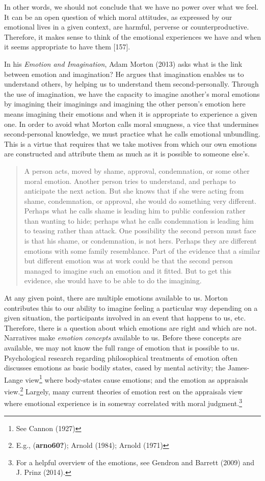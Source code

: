 \documentclass[12pt]{book}
\theoremstyle{definition}
\theoremstyle{remark}
\begin{document}
In other words, we should not conclude that we have no power over what we feel. It can be an open question of which moral attitudes, as expressed by our emotional lives in a given context, are harmful, perverse or counterproductive. Therefore, it makes sense to think of the emotional experiences we have and when it seems appropriate to have them {[}157{]}.

In his \emph{Emotion and Imagination}, Adam Morton (2013) asks what is the link between emotion and imagination? He argues that imagination enables us to understand others, by helping us to understand them second-personally. Through the use of imagination, we have the capacity to imagine another's moral emotions by imagining their imaginings and imagining the other person's emotion here means imagining their emotions and when it is appropriate to experience a given one. In order to avoid what Morton calls moral smugness, a vice that undermines second-personal knowledge, we must practice what he calls emotional unbundling. This is a virtue that requires that we take motives from which our own emotions are constructed and attribute them as much as it is possible to someone else's.

\begin{quote}
A person acts, moved by shame, approval, condemnation, or some other moral emotion. Another person tries to understand, and perhaps to anticipate the next action. But she knows that if she were acting from shame, condemnation, or approval, she would do something very different. Perhaps what he calls shame is leading him to public confession rather than wanting to hide; perhaps what he calls condemnation is leading him to teasing rather than attack. One possibility the second person must face is that his shame, or condemnation, is not hers. Perhaps they are different emotions with some family resemblance. Part of the evidence that a similar but different emotion was at work could be that the second person managed to imagine such an emotion and it fitted. But to get this evidence, she would have to be able to do the imagining.
\end{quote}

At any given point, there are multiple emotions available to us. Morton contributes this to our ability to imagine feeling a particular way depending on a given situation, the participants involved in an event that happens to us, etc. Therefore, there is a question about which emotions are right and which are not. Narratives make \emph{emotion concepts} available to us. Before these concepts are available, we may not know the full range of emotion that is possible to us. Psychological research regarding philosophical treatments of emotion often discusses emotions as basic bodily states, cased by mental activity; the James-Lange view\footnote{See Cannon (1927)} where body-states cause emotions; and the emotion as appraisals view.\footnote{E.g., (\textbf{arno60?}); Arnold (1984); Arnold (1971)} Largely, many current theories of emotion rest on the appraisals view where emotional experience is in someway correlated with moral judgment.\footnote{For a helpful overview of the emotions, see Gendron and Barrett (2009) and J. Prinz (2014).}
\end{document}
